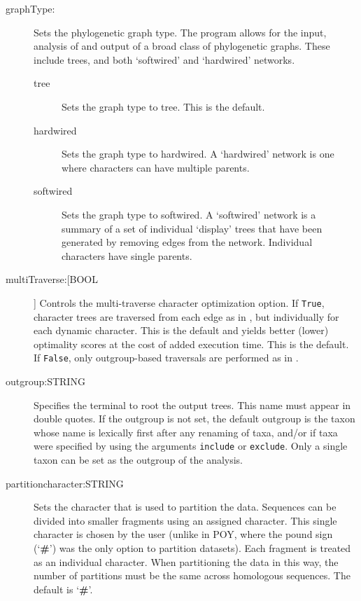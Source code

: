 \begin{description}
		\item[graphType:] Sets the phylogenetic graph type. The program allows for the input, 
		analysis of and output of a broad class of phylogenetic graphs. These include trees, 
		and both `softwired’ and `hardwired’ networks. 
			
			\begin{description}
			\item[tree] Sets the graph type to tree. This is the default.
		
			\item[hardwired]  Sets the graph type to hardwired. A `hardwired' network is 
			one where characters can have multiple parents.
	
			\item[softwired]  Sets the graph type to softwired. A `softwired' network is 
			a summary of a set of individual `display' trees
			that have been generated by removing edges from the network. Individual 
			characters have single parents.				
			\end{description}
		
			
		\item[multiTraverse:[BOOL]] Controls the multi-traverse character optimization 
		option. If \texttt{True}, character trees are traversed from each edge as in 
		\citep{VaronandWheeler2012,VaronandWheeler2013, POY4, POY5}, but 
		individually for each dynamic character. This is the default and yields better 
		(lower) optimality scores at the cost of added execution time. This is the default.
		If \texttt{False}, only outgroup-based traversals are performed as in 
		\citep{Wheeler1996, POY2, POY3}. 
					
		\item[outgroup:STRING] Specifies the terminal to root the output trees. 
		This name must appear in double quotes. If the outgroup is not set, the 
		default outgroup is the taxon whose name is lexically first after any renaming 
		of taxa, and/or if taxa were specified by using the arguments \texttt{include} 
		or \texttt{exclude}. Only a single taxon can be set as the outgroup of the analysis. 
					
		\item[partitioncharacter:STRING] Sets the character that is used to partition the 
		data. Sequences can be divided into smaller fragments using an assigned character. 
		This single character is chosen by the user (unlike in POY, where the pound sign 
		(`\textbf{\#}') was the only option to partition datasets). Each fragment is treated as an individual 
		character. When partitioning the data in this way, the number of partitions must be the 
		same across homologous sequences. The default is `\textbf{\#}'.
			

\end{description}
